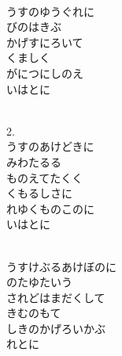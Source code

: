 \documentclass[10pt,b5j]{tarticle} %
\begin{document}
\vspace{1.5em} %
\newcommand{\linespace}{0.5em} %
\newcommand{\blocksize}{0.5\hsize} %
\newcommand{\itemmargin}{6em} %
\begin{enumerate} %
    \setlength{\itemindent}{\itemmargin} %
    \begin{minipage}[c]{\blocksize}
    
        \vspace{\linespace}
        \item~\\
        うすのゆうぐれに\\
        びのはきぶ\\
        かげすにろいて\\
        くましく\\
        がにつにしのえ\\
        いはとに
        
        \vspace{\linespace}
        \item~\\
        2.	\\
        うすのあけどきに\\
        みわたるる\\
        ものえてたくく\\
        くもるしさに\\
        れゆくものこのに\\
        いはとに
        
        \vspace{\linespace}
        \item~\\
        うすけぶるあけぼのに\\
        のたゆたいう\\
        されどはまだくして\\
        きむのもて\\
        しきのかげろいかぶ\\
        れとに
        

\end{minipage}
\end{enumerate}
\end{document}
